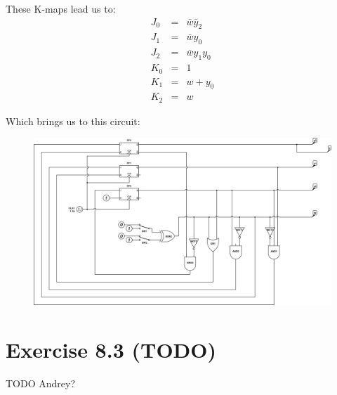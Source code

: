 \documentclass[10pt,a4paper]{scrartcl}
\begin{document}
These K-maps lead us to:
\begin{eqnarray*}
    J_0 &=& \bar w\bar y_2\\
    J_1 &=& \bar wy_0\\
    J_2 &=& \bar wy_1y_0\\
    K_0 &=& 1\\
    K_1 &=& w+y_0\\
    K_2 &=& w
\end{eqnarray*}

Which brings us to this circuit:
\begin{figure}[h]
\includegraphics[width=\textwidth]{images/8_2-4counter.png} 
\end{figure}

\FloatBarrier
\section*{Exercise 8.3 (TODO)}

TODO Andrey?
\end{document}
